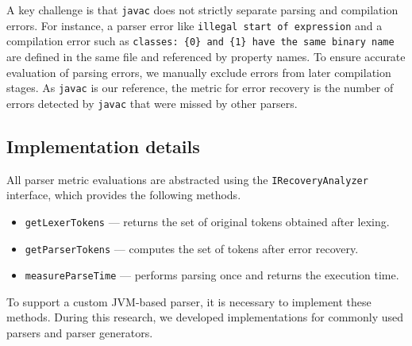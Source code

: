 \documentclass[conference]{IEEEtran}
\begin{document}
A key challenge is that \texttt{javac} does not strictly separate parsing and compilation errors. For instance, a parser error like \texttt{illegal start of expression} and a compilation error such as \texttt{classes: \{0\} and \{1\} have the same binary name} are defined in the same file and referenced by property names. To ensure accurate evaluation of parsing errors, we manually exclude errors from later compilation stages. As \texttt{javac} is our reference, the metric for error recovery is the number of errors detected by \texttt{javac} that were missed by other parsers.

\subsection{Implementation details}
All parser metric evaluations are abstracted using the \texttt{IRecoveryAnalyzer} interface, which provides the following methods.
\begin{itemize}
    \item \texttt{getLexerTokens} --- returns the set of original tokens obtained after lexing.
    \item \texttt{getParserTokens} --- computes the set of tokens after error recovery.
    \item \texttt{measureParseTime} --- performs parsing once and returns the execution time.
\end{itemize}

To support a custom JVM-based parser, it is necessary to implement these methods. During this research, we developed implementations for commonly used parsers and parser generators.
\end{document}
